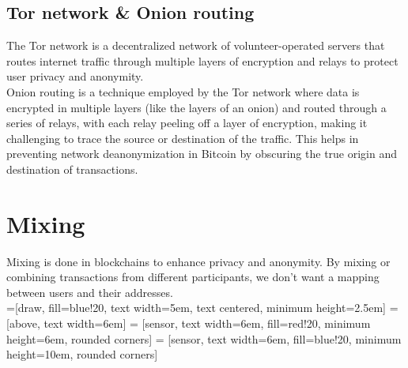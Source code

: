 \documentclass{article}
\begin{document}
\subsection{Tor network \& Onion routing}
The Tor network is a decentralized network of volunteer-operated servers that routes internet traffic through multiple layers of encryption and relays to protect user privacy and anonymity.\\
Onion routing is a technique employed by the Tor network where data is encrypted in multiple layers (like the layers of an onion) and routed through a series of relays, with each relay peeling off a layer of encryption, making it challenging to trace the source or destination of the traffic. This helps in preventing network deanonymization in Bitcoin by obscuring the true origin and destination of transactions.
\section{Mixing}
Mixing is done in blockchains to enhance privacy and anonymity. By mixing or combining transactions from different participants, we don't want a mapping between users and their addresses. \\
=[draw, fill=blue!20, text width=5em, 
text centered, minimum height=2.5em]
 = [above, text width=6em]
 = [sensor, text width=6em, fill=red!20, 
minimum height=6em, rounded corners]
 = [sensor, text width=6em, fill=blue!20, 
minimum height=10em, rounded corners]
\def\blockdist{2.3}
\def\edgedist{1}
\begin{center}
\end{center}
\end{document}
